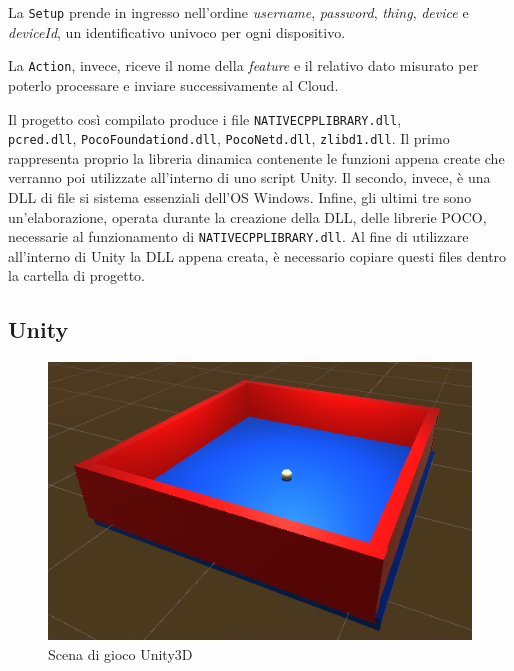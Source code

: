 La \texttt{Setup} prende in ingresso nell'ordine \textit{username}, \textit{password}, \textit{thing}, \textit{device}  e \textit{deviceId}, un identificativo univoco per ogni dispositivo.

La \texttt{Action}, invece, riceve il nome della \textit{feature} e il relativo dato misurato per poterlo processare e inviare successivamente al Cloud.

Il progetto così compilato produce i file \texttt{NATIVECPPLIBRARY.dll}, \\\texttt{pcred.dll}, \texttt{PocoFoundationd.dll}, \texttt{PocoNetd.dll}, \texttt{zlibd1.dll}. Il primo rappresenta proprio la libreria dinamica contenente le funzioni appena create che verranno poi utilizzate all'interno di uno script Unity. Il secondo, invece, è una DLL di file si sistema essenziali dell'OS Windows. Infine, gli ultimi tre sono un’elaborazione, operata durante la creazione della DLL, delle librerie POCO, necessarie al funzionamento di  \texttt{NATIVECPPLIBRARY.dll}. Al fine di utilizzare all'interno di Unity la DLL appena creata, è necessario copiare questi files dentro la cartella di progetto.
\subsection{Unity}

\begin{figure}[H]
	\centering
	\includegraphics[scale=1.1]{pics/ring}
	\caption{Scena di gioco Unity3D}
	\label{ring}
\end{figure}

